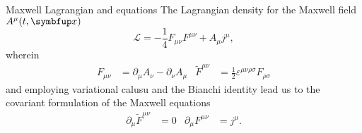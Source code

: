 \documentclass[aspectratio=169,usenames,dvipsnames]{beamer}
\begin{document}
	\begin{frame}{Maxwell Lagrangian and equations}
		The Lagrangian density for the Maxwell field $A^\mu(t,\vb{x})$
		\begin{equation}
			\mathcal{L}
			=
			-
			\frac{1}{4}
			F_{\mu\nu}
			F^{\mu\nu}
			+
			A_\mu j^\mu
			,
		\end{equation}
		wherein
		\begin{align}
			F_{\mu\nu}
			&=
			\partial_\mu
			A_\nu
			-
			\partial_\nu
			A_\mu
			&
			\tilde{F}^{\mu\nu}
			&=
			\frac{1}{2}
			\varepsilon^{\mu\nu\rho\sigma}
			F_{\rho\sigma}
		\end{align}
		and employing variational calusu and the Bianchi identity lead us to the covariant formulation of the Maxwell equations
		\begin{align}
			\partial_\mu
			\tilde{F}^{\mu\nu}
			&=
			0
			&
			\partial_\mu
			F^{\mu\nu}
			&=
			j^\mu
			.
		\end{align}
	\end{frame}
\end{document}
